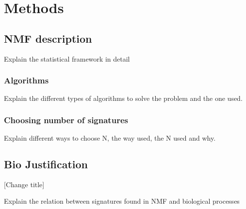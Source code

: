 
\chapter{Methods}\label{Methods} %


\section{NMF description}

Explain the statistical framework in detail

\subsection{Algorithms}

Explain the different types of algorithms to solve the problem and the one used.


\subsection{Choosing number of signatures}

Explain different ways to choose N, the way used, the N used and why.


\section{Bio Justification}

[Change title]

Explain the relation between signatures found in NMF and biological processes


